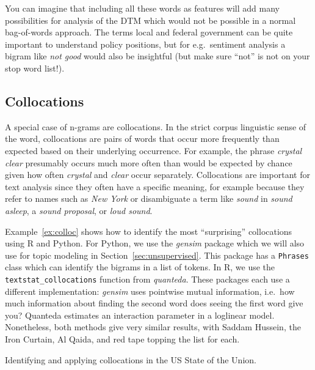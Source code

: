 You can imagine that including all these words as features will add many possibilities for analysis of the DTM
which would not be possible in a normal bag-of-words approach.
The terms local and federal government can be quite important to understand policy positions,
but for e.g.\ sentiment analysis a bigram like \emph{not good} would also be insightful
(but make sure ``not'' is not on your stop word list!).

\subsection{Collocations}\label{sec:collocations}

A special case of n-grams are collocations.
In the strict corpus linguistic sense of the word, collocations are pairs of words that occur more frequently than expected
based on their underlying occurrence.
For example, the phrase \emph{crystal clear} presumably occurs much more often than would be expected by chance given
how often \emph{crystal} and \emph{clear} occur separately.
Collocations are important for text analysis since they often have a specific meaning,
for example because they refer to names such as \emph{New York} or disambiguate a term like \emph{sound} in \emph{sound asleep},
a \emph{sound proposal}, or \emph{loud sound}.

Example~\ref{ex:colloc} shows how to identify the most ``surprising'' collocations using R and Python.
For Python, we use the \emph{gensim} package which we will also use for topic modeling in Section~\ref{sec:unsupervised}.
This package has a \texttt{Phrases} class which can identify the bigrams in a list of tokens.
In R, we use the \texttt{textstat\_collocations} function from \emph{quanteda}.
These packages each use a different implementation: \emph{gensim} uses pointwise mutual information,
i.e.\ how much information about finding the second word does seeing the first word give you?
Quanteda estimates an interaction parameter in a loglinear model.
Nonetheless, both methods give very similar results, with Saddam Hussein, the Iron Curtain, Al Qaida, and red tape topping the list for each.


\begin{ccsexample}
\caption{Identifying and applying collocations in the US State of the Union.}\label{ex:colloc}
\end{ccsexample}


